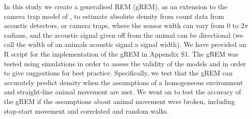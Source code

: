In this study we create a generalised REM (gREM), as an extension to the camera trap model of \citep{rowcliffe2008estimating}, to estimate absolute density from count data from acoustic detectors, or camera traps, where the sensor width can vary from 0 to $2\pi$ radians, and the acoustic signal given off from the animal can be directional (we call the width of an animals acoustic signal a signal width). We have provided an R \citep{R} script for the implementation of the gREM in Appendix S1. The gREM was tested using simulations in order to assess the validity of the models and in order to give suggestions for best practice. Specifically, we test that the gREM can accurately predict density when the assumptions of a homogeneous environment and straight-line animal movement are met. We went on to test the accuracy of the gREM if the assumptions about animal movement were broken, including stop-start movement and correlated and random walks.
